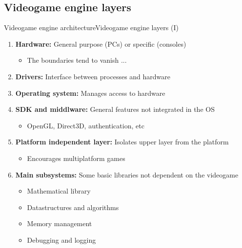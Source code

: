 \documentclass[10pt,compress]{beamer} %
\begin{document}
\subsection{Videogame engine layers}
\begin{frame}[plain]{Videogame engine architecture}{Videogame engine layers (I)}
	\begin{enumerate}
	\item \textbf{Hardware:} General purpose (PCs) or specific (consoles)
		\begin{itemize}
		\item The boundaries tend to vanish ...
		\end{itemize}
	\item \textbf{Drivers:} Interface between processes and hardware
	\item \textbf{Operating system:} Manages access to hardware
	\item \textbf{SDK and middlware:} General features not integrated in the OS
		\begin{itemize}
		\item OpenGL, Direct3D, authentication, etc
		\end{itemize}
	\item \textbf{Platform independent layer:} Isolates upper layer from the platform
		\begin{itemize}
		\item Encourages multiplatform games
		\end{itemize}
	\item \textbf{Main subsystems:} Some basic libraries not dependent on the videogame
		\begin{itemize}
		\item Mathematical library
		\item Datastructures and algorithms
		\item Memory management
		\item Debugging and logging
		\end{itemize}
	\end{enumerate}
\end{frame}
\end{document}

